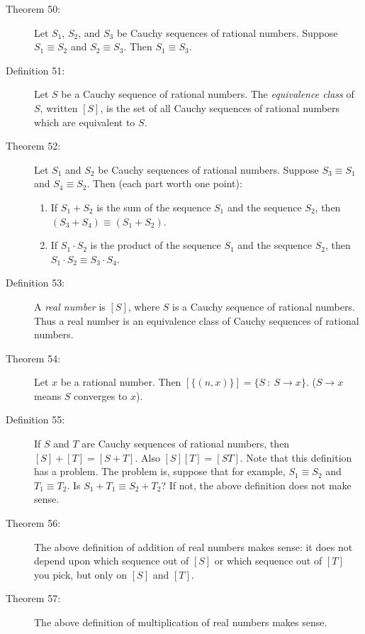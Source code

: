 \documentclass{article}
\begin{document}
\begin{description}
  \item[Theorem 50:] Let $S_{1}$, $S_{2}$, and $S_{3}$ be Cauchy sequences of rational numbers. Suppose $S_{1} \equiv S_{2}$ and $S_{2} \equiv S_{3}$. Then $S_{1} \equiv S_{3}$. 

  \item[Definition 51:] Let $S$ be a Cauchy sequence of rational numbers. The \emph{equivalence class} of $S$, written $[S]$, is the set of all Cauchy sequences of rational numbers which are equivalent to $S$.

  \item[Theorem 52:] Let $S_{1}$ and $S_{2}$ be Cauchy sequences of rational numbers. Suppose $S_{3} \equiv S_{1}$ and $S_{4} \equiv S_{2}$. Then (each part worth one point):
    \begin{enumerate}
      \item If $S_{1} + S_{2}$ is the sum of the sequence $S_{1}$ and the sequence $S_{2}$, then $(S_{3} + S_{4}) \equiv (S_{1} + S_{2})$. 
      \item If $S_{1} \cdot S_{2}$ is the product of the sequence $S_{1}$ and the sequence $S_{2}$, then $S_{1} \cdot S_{2} \equiv S_{3} \cdot S_{4}$. 
    \end{enumerate}

  \item[Definition 53:] A \emph{real number} is $[S]$, where $S$ is a Cauchy sequence of rational numbers. Thus a real number is an equivalence class of Cauchy sequences of rational numbers.

  \item[Theorem 54:] Let $x$ be a rational number. Then $[ \{ (n,x) \} ] = \{ S\ :\ S \rightarrow x \}$. ($S \rightarrow x$ means $S$ converges to $x$). 

  \item[Definition 55:] If $S$ and $T$ are Cauchy sequences of rational numbers, then $[S] + [T] = [S+T]$. Also $[S] [T] = [ST]$. Note that this definition has a problem. The problem is, suppose that for example, $S_{1} \equiv S_{2}$ and $T_{1} \equiv T_{2}$. Is $S_{1} + T_{1} \equiv S_{2} + T_{2}$? If not, the above definition does not make sense.

  \item[Theorem 56:] The above definition of addition of real numbers makes sense: it does not depend upon which sequence out of $[S]$ or which sequence out of $[T]$ you pick, but only on $[S]$ and $[T]$. 

  \item[Theorem 57:] The above definition of multiplication of real numbers makes sense.


\end{description}
\end{document}
